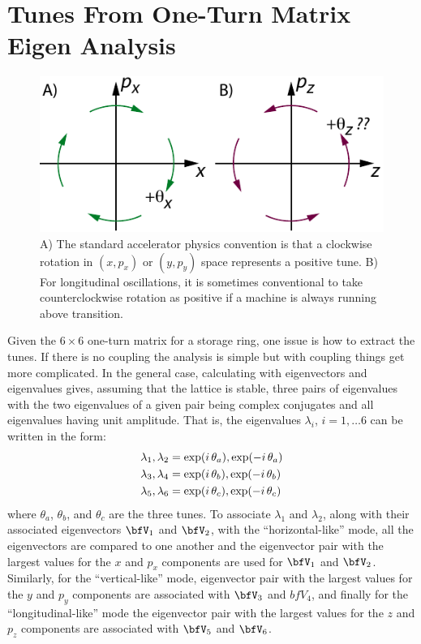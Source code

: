 \section{Tunes From One-Turn Matrix Eigen Analysis}
\label{s:eigen.tune}

\begin{figure}[tb]
  \centering
  \includegraphics[width=5in]{tune.pdf}
  \caption[Illustration of a positive tune]{A) The standard accelerator physics convention is that 
a clockwise rotation in $(x, p_x)$ or $(y, p_y)$ space represents a positive tune. B) For longitudinal
oscillations, it is sometimes conventional to take counterclockwise rotation as positive if a machine
is always running above transition.}
  \label{f:tune}
\end{figure}

Given the $6 \times 6$ one-turn matrix for a storage ring, one issue is how to extract the tunes. If
there is no coupling the analysis is simple but with coupling things get more complicated. In the
general case, calculating with eigenvectors and eigenvalues gives, assuming that the lattice is
stable, three pairs of eigenvalues with the two eigenvalues of a given pair being complex
conjugates and all eigenvalues having unit amplitude. That is, the eigenvalues $\lambda_i$, $i =
1, \ldots 6$ can be written in the form:
\begin{align}
  \lambda_1, \lambda_2 &= \exp(i \, \theta_a), \exp(-i \, \theta_a) \nonumber \\
  \lambda_3, \lambda_4 &= \exp(i \, \theta_b), \exp(-i \, \theta_b) \\
  \lambda_5, \lambda_6 &= \exp(i \, \theta_c), \exp(-i \, \theta_c) \nonumber
  \label{lleit}
\end{align}
where $\theta_a$, $\theta_b$, and $\theta_c$ are the three tunes. To associate $\lambda_1$ and
$\lambda_2$, along with their associated eigenvectors $\bfV_1$ and $\bfV_2$, with the
``horizontal-like'' mode, all the eigenvectors are compared to one another and the eigenvector pair
with the largest values for the $x$ and $p_x$ components are used for $\bfV_1$ and $\bfV_2$.
Similarly, for the ``vertical-like'' mode, eigenvector pair with the largest values for the $y$ and
$p_y$ components are associated with $\bfV_3$ and $bfV_4$, and finally for the ``longitudinal-like''
mode the eigenvector pair with the largest values for the $z$ and $p_z$ components are associated
with $\bfV_5$ and $\bfV_6$.

